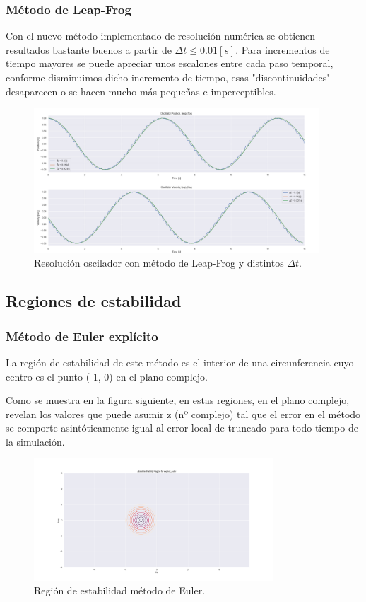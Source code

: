 \documentclass[12pt,a4paper]{article}
\begin{document}
\subsubsection{Método de Leap-Frog}
Con el nuevo método implementado de resolución numérica se obtienen resultados bastante buenos a partir de $\Delta t \leq 0.01 [s]$. Para incrementos de tiempo mayores se puede apreciar unos escalones entre cada paso temporal, conforme disminuimos dicho incremento de tiempo, esas "discontinuidades" desaparecen o se hacen mucho más pequeñas e imperceptibles.
\begin{figure}[H]
	\centering
	\includegraphics[width=0.95\textwidth]{FIGURES/mil4/osci_leap.png}
	\caption{Resolución oscilador con método de Leap-Frog y distintos $\Delta t$.}
	\label{osci_leap}
\end{figure}


\subsection{Regiones de estabilidad}
\subsubsection{Método de Euler explícito}
La región de estabilidad de este método es el interior de una circunferencia cuyo centro es el punto (-1, 0) en el plano complejo.

Como se muestra en la figura siguiente, en estas regiones, en el plano complejo, revelan los valores que puede asumir z (nº complejo) tal que el error en el método se comporte asintóticamente igual al error local de truncado para todo tiempo de la simulación.
\begin{figure}[H]
	\centering
	\includegraphics[width=0.8\textwidth]{FIGURES/mil4/st_euler.png}
	\caption{Región de estabilidad método de Euler.}
	\label{st_euler}
\end{figure}
\end{document}
